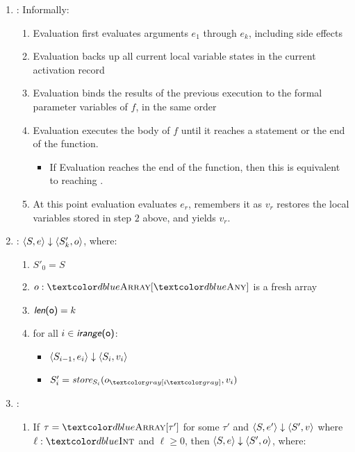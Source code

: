 \begin{enumerate}
\begin{enumerate}
  \item {}: Informally:
    \begin{enumerate}
      \item Evaluation first evaluates arguments $e_1$ through $e_k$, including side effects
      \item Evaluation backs up all current local variable states in the current activation record
      \item Evaluation binds the results of the previous execution to the formal parameter variables of $f$, in the same order
      \item Evaluation executes the body of $f$ until it reaches a  statement or the end of the function.
        \begin{itemize}
          \item If Evaluation reaches the end of the function, then this is equivalent to reaching .
        \end{itemize}
      \item At this point evaluation evaluates $e_r$, remembers it as $v_r$ restores the local variables stored in step $2$ above, and yields $v_r$.
    \end{enumerate}
  \item \vterminal{[$e_1$, \ldots, $e_k$]}: $\langle S,e \rangle \downarrow \langle S'_k,o \rangle$, where:
    \begin{enumerate}
      \item $S'_0 = S$
      \item $o : \TArrayof{\TAny}$ is a fresh array
      \item $\textsf{\textit{len}(o)} = k$
      \item for all $i \in \textsf{\textit{irange}(o)}$:
        \begin{itemize}
          \item $\langle S_{i-1},e_i \rangle \downarrow \langle S_i, v_i \rangle$
          \item $S'_i = \textit{store}_{S_i}(\arrsub{o}{i}, v_i)$
        \end{itemize}
    \end{enumerate}
  \item {}:
    \begin{enumerate}
    \item If $\tau = \TArrayof{\tau'}$ for some $\tau'$ and $\langle S,e' \rangle \downarrow \langle S',v \rangle$ where $\ell : \TInt$ and $\ell \ge 0$, then $\langle S,e \rangle \downarrow \langle S',o \rangle$, where:

\end{enumerate}
\end{enumerate}
\end{enumerate}
